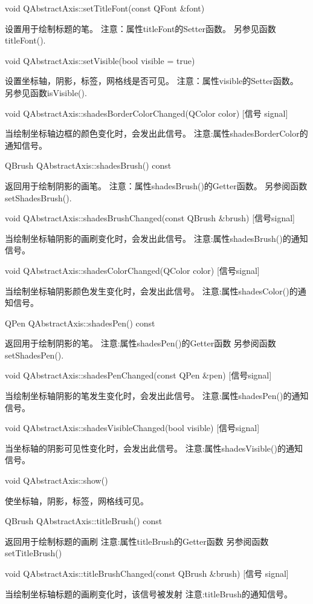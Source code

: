 void QAbstractAxis::setTitleFont(const QFont \&font) 

设置用于绘制标题的笔。 注意：属性titleFont的Setter函数。 另参见函数titleFont().

void QAbstractAxis::setVisible(bool visible = true) 

设置坐标轴，阴影，标签，网格线是否可见。 注意：属性visible的Setter函数。 另参见函数isVisible().

void QAbstractAxis::shadesBorderColorChanged(QColor color) [信号
signal] 

当绘制坐标轴边框的颜色变化时，会发出此信号。 注意:属性shadesBorderColor的通知信号。

QBrush QAbstractAxis::shadesBrush() const 

返回用于绘制阴影的画笔。 注意：属性shadesBrush()的Getter函数。 另参阅函数setShadesBrush().

void QAbstractAxis::shadesBrushChanged(const QBrush \&brush) [信号signal] 

当绘制坐标轴阴影的画刷变化时，会发出此信号。 注意:属性shadesBrush()的通知信号。

void QAbstractAxis::shadesColorChanged(QColor color) [信号signal] 

当绘制坐标轴阴影颜色发生变化时，会发出此信号。 注意:属性shadesColor()的通知信号。

QPen QAbstractAxis::shadesPen() const 

返回用于绘制阴影的笔。 注意:属性shadesPen()的Getter函数 另参阅函数setShadesPen().

void QAbstractAxis::shadesPenChanged(const QPen \&pen) [信号signal] 

当绘制坐标轴阴影的笔发生变化时，会发出此信号。 注意:属性shadesPen()的通知信号。

void QAbstractAxis::shadesVisibleChanged(bool visible) [信号signal] 

当坐标轴的阴影可见性变化时，会发出此信号。 注意:属性shadesVisible()的通知信号。

void QAbstractAxis::show() 

使坐标轴，阴影，标签，网格线可见。

QBrush QAbstractAxis::titleBrush() const 

返回用于绘制标题的画刷 注意:属性titleBrush的Getter函数 另参阅函数setTitleBrush()

void QAbstractAxis::titleBrushChanged(const QBrush \&brush) [信号
signal] 

当绘制坐标轴标题的画刷变化时，该信号被发射 注意:titleBrush的通知信号。


